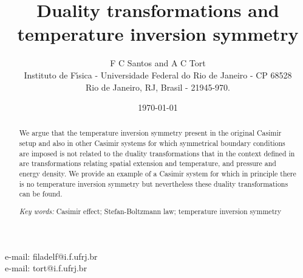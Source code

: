 \documentclass[a4paper,12pt]{article}
\begin{document}
\title{Duality transformations and temperature inversion symmetry }
\author{{\large F C Santos\myHighlight{$^{\star}$}\coordHE{} and A C Tort\myHighlight{$%
^{\dagger}$}\coordHE{}} \\
Instituto de F\'{\i}sica - Universidade Federal do Rio de Janeiro - CP 68528
\\
Rio de Janeiro, RJ, Brasil - 21945-970.}
\date{\today}
\maketitle
%
\begin{abstract}
%
We argue that the temperature inversion symmetry present in the original Casimir setup and also in other Casimir systems for which symmetrical boundary conditions are imposed is not related to the duality transformations that in the context defined in \cite{Fukushima&Ohta2001}  are transformations relating spatial extension and temperature, and pressure and energy density. We provide an example of a Casimir system for which in principle there is no temperature inversion symmetry but nevertheless these duality transformations can be found.
%

\vskip 1.0cm
%
\emph{Key words:} Casimir effect; Stefan-Boltzmann law; temperature inversion symmetry 
%
\end{abstract}

\vfill
\noindent \myHighlight{$^{\star }$}\coordHE{} {e-mail: filadelf@i.f.ufrj.br}\\
\noindent \myHighlight{$^\dagger$}\coordHE{} {e-mail: tort@i.f.ufrj.br}
\clearpage
%
\end{document}
